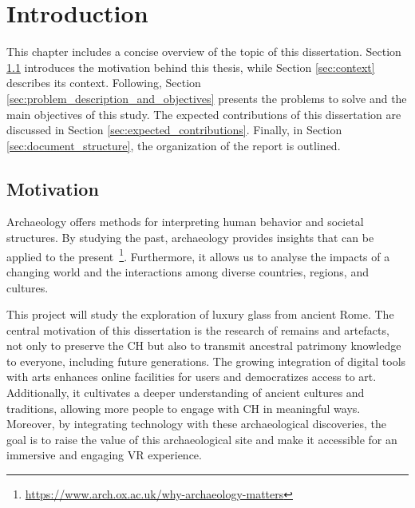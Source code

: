 
%

\chapter{Introduction}
\label{cha:introduction}

This chapter includes a concise overview of the topic of this dissertation. 
Section \ref{sec:motivation} introduces the motivation behind this thesis, while Section \ref{sec:context} describes its context.
Following, Section \ref{sec:problem_description_and_objectives} presents the problems to solve and the main objectives of this study. 
The expected contributions of this dissertation are discussed in Section \ref{sec:expected_contributions}.
Finally, in Section \ref{sec:document_structure}, the organization of the report is outlined.

\section{Motivation}
\label{sec:motivation}
Archaeology offers methods for interpreting human behavior and societal structures. By studying the past, archaeology provides insights that can be applied to the present~\footnote{\url{https://www.arch.ox.ac.uk/why-archaeology-matters}}.
Furthermore, it allows us to analyse the impacts of a changing world and the interactions among diverse countries, regions, and cultures.

This project will study the exploration of luxury glass from ancient Rome.
The central motivation of this dissertation is the research of remains and artefacts, not
only to preserve the \gls{CH} but also to transmit ancestral patrimony knowledge to everyone, including future generations. 
The growing integration of digital tools with arts enhances online 
facilities for users and democratizes access to art. Additionally, it cultivates a deeper understanding of ancient cultures and traditions, allowing more people to engage with
\gls{CH} in meaningful ways. Moreover, by integrating technology with these archaeological 
discoveries, the goal is to raise the value of this archaeological site and make it accessible for an immersive and engaging \gls{VR} experience.


